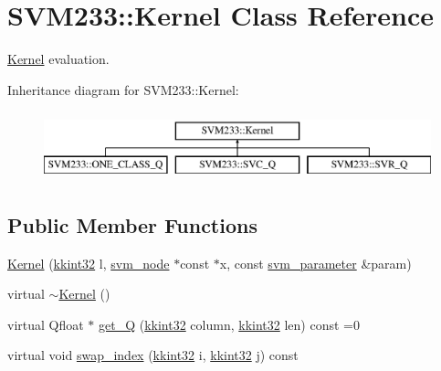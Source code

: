\hypertarget{class_s_v_m233_1_1_kernel}{}\section{S\+V\+M233\+:\+:Kernel Class Reference}
\label{class_s_v_m233_1_1_kernel}


\hyperlink{class_s_v_m233_1_1_kernel}{Kernel} evaluation.  


Inheritance diagram for S\+V\+M233\+:\+:Kernel\+:\begin{figure}[H]
\begin{center}
\leavevmode
\includegraphics[height=2.000000cm]{class_s_v_m233_1_1_kernel}
\end{center}
\end{figure}
\subsection*{Public Member Functions}
\begin{DoxyCompactItemize}
\item 
\hyperlink{class_s_v_m233_1_1_kernel_a8d372c933e61053f9b1dacbe28e41416}{Kernel} (\hyperlink{namespace_k_k_b_a8fa4952cc84fda1de4bec1fbdd8d5b1b}{kkint32} l, \hyperlink{struct_s_v_m233_1_1svm__node}{svm\+\_\+node} $\ast$const $\ast$x, const \hyperlink{struct_s_v_m233_1_1svm__parameter}{svm\+\_\+parameter} \&param)
\item 
virtual \hyperlink{class_s_v_m233_1_1_kernel_a4b531df01a491221f231446e0dabdeda}{$\sim$\+Kernel} ()
\item 
virtual Qfloat $\ast$ \hyperlink{class_s_v_m233_1_1_kernel_ab300ecdac57b04f74f4f279bc4e60c33}{get\+\_\+Q} (\hyperlink{namespace_k_k_b_a8fa4952cc84fda1de4bec1fbdd8d5b1b}{kkint32} column, \hyperlink{namespace_k_k_b_a8fa4952cc84fda1de4bec1fbdd8d5b1b}{kkint32} len) const  =0
\item 
virtual void \hyperlink{class_s_v_m233_1_1_kernel_a8d1cb5b8206297192aaedd5ff682d89c}{swap\+\_\+index} (\hyperlink{namespace_k_k_b_a8fa4952cc84fda1de4bec1fbdd8d5b1b}{kkint32} i, \hyperlink{namespace_k_k_b_a8fa4952cc84fda1de4bec1fbdd8d5b1b}{kkint32} j) const 
\end{DoxyCompactItemize}
